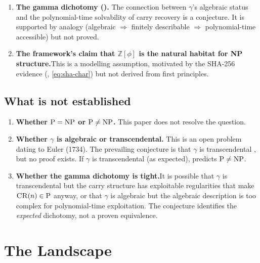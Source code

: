 \documentclass[12pt, a4paper]{article}
\theoremstyle{plain}
\theoremstyle{definition}
\theoremstyle{remark}
\newcommand{\Z}{\mathbb{Z}}
\newcommand{\NP}{\textup{NP}}
\newcommand{\PP}{\textup{P}}
\newcommand{\Zphi}{\Z[\phi]}
\begin{document}
\begin{enumerate}[nosep]
  \item \textbf{The gamma dichotomy ().}\quad
        The connection between $\gamma$'s algebraic status and the
        polynomial-time solvability of carry recovery is a conjecture.
        It is supported by analogy (algebraic $\Rightarrow$ finitely
        describable $\Rightarrow$ polynomial-time accessible) but not
        proved.

  \item \textbf{The framework's claim that $\Zphi$ is the natural
        habitat for NP structure.}\quad This is a modelling
        assumption, motivated by the SHA-256 evidence
        (, \eqref{eq:sha-char}) but not
        derived from first principles.
\end{enumerate}

\subsection{What is not established}

\begin{enumerate}[nosep]
  \item \textbf{Whether $\PP = \NP$ or $\PP \neq \NP$.}\quad
        This paper does not resolve the question.

  \item \textbf{Whether $\gamma$ is algebraic or transcendental.}%
        \quad This is an open problem dating to Euler (1734).  The
        prevailing conjecture is that $\gamma$ is transcendental
        \cite{lagarias2013euler}, but no proof exists.  If $\gamma$
        is transcendental (as expected), 
        predicts $\PP \neq \NP$.

  \item \textbf{Whether the gamma dichotomy is tight.}\quad It is
        possible that $\gamma$ is transcendental but the carry
        structure has exploitable regularities that make
        $\textsc{CR}(n) \in \PP$ anyway, or that $\gamma$ is
        algebraic but the algebraic description is too complex for
        polynomial-time exploitation.  The conjecture identifies the
        \emph{expected} dichotomy, not a proven equivalence.
\end{enumerate}

\section{The Landscape}
\label{sec:landscape}
\end{document}
